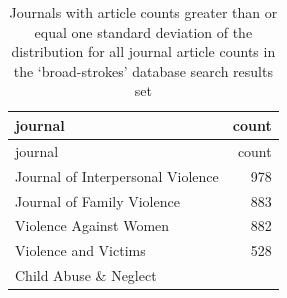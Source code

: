 \documentclass[]{tufte-handout}
\begin{document}
\begin{longtable}[]{@{}lr@{}}
\caption{Journals with article counts greater than or equal one standard
deviation of the distribution for all journal article counts in the
`broad-strokes' database search results set}\tabularnewline
\toprule
\begin{minipage}[b]{0.60\columnwidth}\raggedright\strut
journal\strut
\end{minipage} & \begin{minipage}[b]{0.09\columnwidth}\raggedleft\strut
count\strut
\end{minipage}\tabularnewline
\midrule
\endfirsthead
\toprule
\begin{minipage}[b]{0.60\columnwidth}\raggedright\strut
journal\strut
\end{minipage} & \begin{minipage}[b]{0.09\columnwidth}\raggedleft\strut
count\strut
\end{minipage}\tabularnewline
\midrule
\endhead
\begin{minipage}[t]{0.60\columnwidth}\raggedright\strut
Journal of Interpersonal Violence\strut
\end{minipage} & \begin{minipage}[t]{0.09\columnwidth}\raggedleft\strut
978\strut
\end{minipage}\tabularnewline
\begin{minipage}[t]{0.60\columnwidth}\raggedright\strut
Journal of Family Violence\strut
\end{minipage} & \begin{minipage}[t]{0.09\columnwidth}\raggedleft\strut
883\strut
\end{minipage}\tabularnewline
\begin{minipage}[t]{0.60\columnwidth}\raggedright\strut
Violence Against Women\strut
\end{minipage} & \begin{minipage}[t]{0.09\columnwidth}\raggedleft\strut
882\strut
\end{minipage}\tabularnewline
\begin{minipage}[t]{0.60\columnwidth}\raggedright\strut
Violence and Victims\strut
\end{minipage} & \begin{minipage}[t]{0.09\columnwidth}\raggedleft\strut
528\strut
\end{minipage}\tabularnewline
\begin{minipage}[t]{0.60\columnwidth}\raggedright\strut
Child Abuse \& Neglect\strut
\end{minipage} & \begin{minipage}[t]{0.09\columnwidth}\raggedleft\strut

\end{minipage}
\end{longtable}
\end{document}

